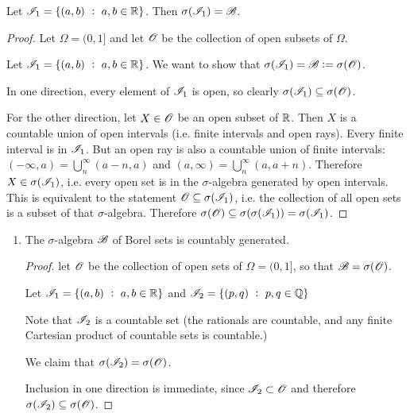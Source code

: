 \begin{enumerate}
  \begin{lemma}\label{hw3-2-11-lemma-1}
    Let $\mathscr I_1 = \{(a, b) ~:~ a, b \in \mathbb{R}\}$. Then $\sigma(\mathscr I_1) = \mathscr B$.
  \end{lemma}
  \begin{proof}
    Let $\Omega = (0, 1]$ and let $\mathscr O$ be the collection of open subsets of $\Omega$.

    Let $\mathscr I_1 = \{(a, b) ~:~ a, b \in \mathbb{R}\}$. We want to show that $\sigma(\mathscr I_1) = \mathscr B := \sigma(\mathscr O)$.

    In one direction, every element of $\mathscr I_1$ is open, so clearly $\sigma(\mathscr I_1) \subseteq \sigma(\mathscr O)$.

    For the other direction, let $X \in \mathscr O$ be an open subset of $\mathbb{R}$. Then $X$ is a countable union of
    open intervals (i.e. finite intervals and open rays). Every finite interval is in $\mathscr I_1$. But an open
    ray is also a countable union of finite intervals: $(-\infty, a) = \bigcup_n^\infty (a-n, a)$
    and $(a, \infty) = \bigcup_n^\infty (a, a + n)$. Therefore $X \in \sigma(\mathscr I_1)$, i.e. every open set
    is in the $\sigma$-algebra generated by open intervals. This is equivalent to the
    statement $\mathscr O \subseteq \sigma(\mathscr I_1)$, i.e. the collection of all open sets is a subset of
    that $\sigma$-algebra. Therefore $\sigma(\mathscr O) \subseteq \sigma(\sigma(\mathscr I_1)) = \sigma(\mathscr I_1)$.
  \end{proof}

  \begin{enumerate}[label=(\alph*)]

  \item
    \begin{claim*}
      The $\sigma$-algebra $\mathscr B$ of Borel sets is countably generated.
    \end{claim*}
    \begin{proof}
      let $\mathscr O$ be the collection of open sets of $\Omega = (0, 1]$, so that $\mathscr B = \sigma(\mathscr O)$.

      Let $\mathscr I_1 = \{(a, b) ~:~ a, b \in \mathbb{R}\}$ and $\mathscr I_2 = \{(p, q) ~:~ p, q \in \mathbb{Q}\}$

      Note that $\mathscr I_2$ is a countable set (the rationals are countable, and any finite Cartesian product of
      countable sets is countable.)

      We claim that $\sigma(\mathscr I_2) = \sigma(\mathscr O)$.

      Inclusion in one direction is immediate, since $\mathscr I_2 \subset \mathscr O$ and
      therefore $\sigma(\mathscr I_2) \subseteq\sigma(\mathscr O)$.


\end{proof}
\end{enumerate}
\end{enumerate}
